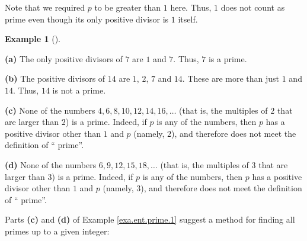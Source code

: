 \documentclass[numbers=enddot,12pt,final,onecolumn,notitlepage]{scrartcl}%
\numberwithin{exer}{subsection}
\theoremstyle{definition}
\newtheorem{exam}[theo]{Example}
\newenvironment{example}[1][]
{\begin{exam}[#1]\begin{leftbar}}
{\end{leftbar}\end{exam}}
\begin{document}
Note that we required $p$ to be greater than $1$ here. Thus, $1$ does not
count as prime even though its only positive divisor is $1$ itself.

\begin{example}
\label{exa.ent.prime.1}\textbf{(a)} The only positive divisors of $7$ are $1$
and $7$. Thus, $7$ is a prime.

\textbf{(b)} The positive divisors of $14$ are $1$, $2$, $7$ and $14$. These
are more than just $1$ and $14$. Thus, $14$ is not a prime.

\textbf{(c)} None of the numbers $4,6,8,10,12,14,16,\ldots$ (that is, the
multiples of $2$ that are larger than $2$) is a prime. Indeed, if $p$ is any
of the numbers, then $p$ has a positive divisor other than $1$ and $p$
(namely, $2$), and therefore does not meet the definition of \textquotedblleft
prime\textquotedblright.

\textbf{(d)} None of the numbers $6,9,12,15,18,\ldots$ (that is, the multiples
of $3$ that are larger than $3$) is a prime. Indeed, if $p$ is any of the
numbers, then $p$ has a positive divisor other than $1$ and $p$ (namely, $3$),
and therefore does not meet the definition of \textquotedblleft
prime\textquotedblright.
\end{example}

Parts \textbf{(c)} and \textbf{(d)} of Example \ref{exa.ent.prime.1} suggest a
method for finding all primes up to a given integer:
\end{document}
